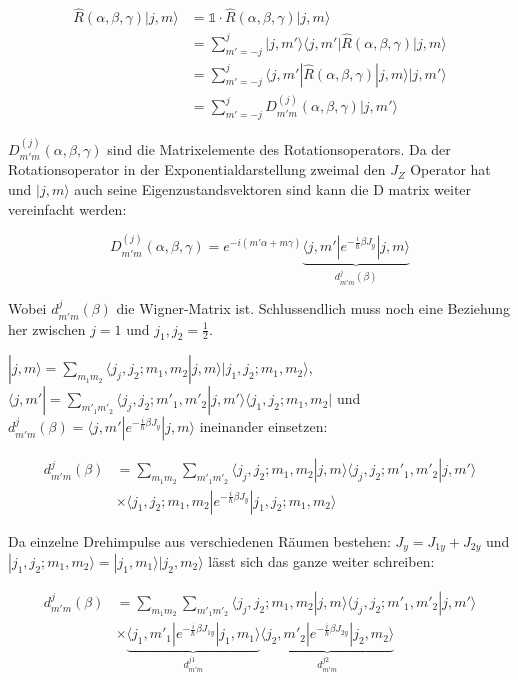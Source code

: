 \begin{align}
\hat R(\alpha, \beta,\gamma)|j,m\rangle &= \mathbb 1 \cdot \hat R(\alpha, \beta,\gamma)|j,m\rangle \\
&= \sum_{m'=-j}^j |j,m'\rangle\langle j,m'| \hat R(\alpha, \beta,\gamma)|j,m\rangle \\
&= \sum_{m'=-j}^j \langle j,m'|  \hat R(\alpha, \beta,\gamma)|j,m\rangle |j,m'\rangle\\
&= \sum_{m'=-j}^j D^{(j)}_{m'm}(\alpha, \beta,\gamma) |j,m'\rangle
\end{align}


\(D^{(j)}_{m'm}(\alpha, \beta,\gamma)\) sind die Matrixelemente des Rotationsoperators. Da der Rotationsoperator in der Exponentialdarstellung zweimal den \(J_Z\) Operator hat und \(|j,m\rangle \) auch seine Eigenzustandsvektoren sind kann die D matrix weiter vereinfacht werden:


\[\boxed{D^{(j)}_{m'm}(\alpha, \beta,\gamma) = e^{-i(m'\alpha+m\gamma)}\underbrace{\langle j,m'|e^{-\frac{i}{\hbar}\beta J_y}|j,m\rangle}_{d_{m'm}^{j}(\beta)}}\]
 

Wobei \(d_{m'm}^{j}(\beta)\)  die Wigner-Matrix ist. Schlussendlich muss noch eine Beziehung her zwischen \(j=1\) und \(j_1,j_2=\frac{1}{2}\). 

\(|j,m\rangle = \sum_{m_1m_2}\langle j_j,j_2;m_1,m_2|j,m\rangle |j_1,j_2;m_1,m_2\rangle \), \(\langle  j,m'| = \sum_{m'_1m'_2}\langle j_j,j_2;m'_1,m'_2|j,m'\rangle \langle j_1,j_2;m_1,m_2| \) und \(d_{m'm}^{j}(\beta)=\langle j,m'|e^{-\frac{i}{\hbar}\beta J_y}|j,m\rangle\) ineinander einsetzen:

\begin{align}
d_{m'm}^{j}(\beta)&=  \sum_{m_1m_2} \sum_{m'_1m'_2}\langle j_j,j_2;m_1,m_2|j,m\rangle\langle j_j,j_2;m'_1,m'_2|j,m'\rangle \\
 &\times \langle j_1,j_2;m_1,m_2|e^{-\frac{i}{\hbar}\beta J_y} |j_1,j_2;m_1,m_2\rangle
\end{align}

 
Da einzelne Drehimpulse aus verschiedenen Räumen bestehen: \(J_y = J_{1y}+J_{2y}\) und \(|j_1,j_2;m_1,m_2\rangle = |j_1,m_1\rangle |j_2,m_2\rangle\) lässt sich das ganze weiter schreiben:


\begin{align}
d_{m'm}^{j}(\beta)&=  \sum_{m_1m_2} \sum_{m'_1m'_2}\langle j_j,j_2;m_1,m_2|j,m\rangle\langle j_j,j_2;m'_1,m'_2|j,m'\rangle \\
 &\times\underbrace{ \langle j_1,m'_1|e^{-\frac{i}{\hbar}\beta J_{1y}}|j_1,m_1\rangle}_{d_{m'm}^{j1}}\underbrace{\langle j_2,m'_2|e^{-\frac{i}{\hbar}\beta J_{2y}} |j_2,m_2\rangle}_{d_{m'm}^{j2}}
\end{align}


